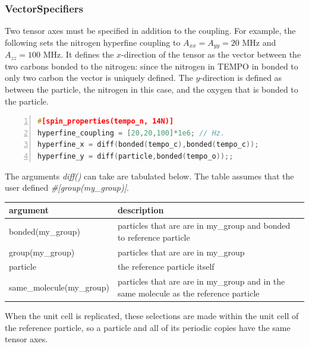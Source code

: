 \documentclass{book}
\begin{document}
\subsubsection{VectorSpecifiers} %
Two tensor axes must be specified in addition to the coupling. 
For example, the following sets the nitrogen hyperfine coupling to 
$A_{xx} = A_{yy} = 20$ MHz and $A_{zz} = 100$ MHz.  
It defines the $x$-direction of the tensor as the vector between the two
carbons bonded to the nitrogen: since the nitrogen in TEMPO in bonded to only
two carbon the vector is uniquely defined.  The $y$-direction is defined as
between the particle, the nitrogen in this case, and the oxygen that is bonded 
to the particle.
\begin{lstlisting}[frame=single,numbers=left,language=c]
#[spin_properties(tempo_n, 14N)]
hyperfine_coupling = [20,20,100]*1e6; // Hz.
hyperfine_x = diff(bonded(tempo_c),bonded(tempo_c));
hyperfine_y = diff(particle,bonded(tempo_o));;
\end{lstlisting}

The arguments \textit{diff()} can take are tabulated below.
The table assumes that the user defined 
\textit{\#[group(my\_group)]}.
\begin{center}
\begin{tabular}{| m{20em} |  m{7cm} |}
 \hline 
 \textbf{argument} & \textbf{description} \\ 
 \hline 
 bonded(my\_group) & 
 particles that are are in my\_group and bonded to reference particle\\ 
 \hline 
 group(my\_group) & 
 particles that are are in my\_group\\ 
 \hline 
 particle & 
 the reference particle itself\\ 
 \hline 
 same\_molecule(my\_group) & 
 particles that are are in my\_group and in the same molecule as 
 the reference particle\\ 
 \hline 
\end{tabular}
\end{center} 
When the unit cell is replicated, these selections are made within
the unit cell of the reference particle,
so a particle and all of its periodic copies have the same tensor axes.
\end{document}
